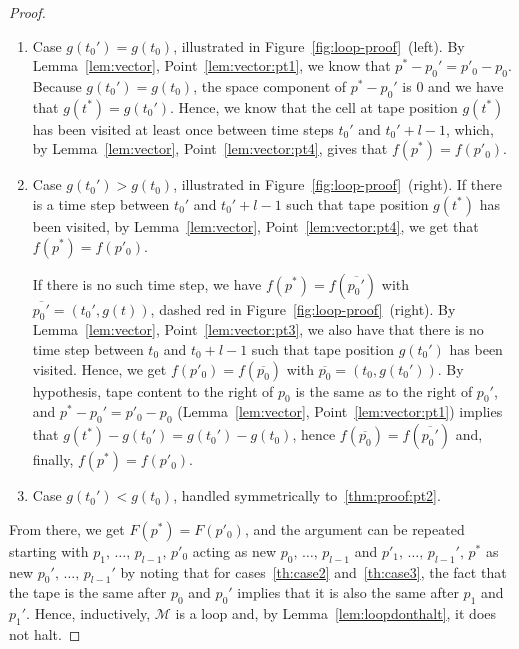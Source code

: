 \begin{proof}
    \begin{enumerate}
        \item Case $g(t_0') = g(t_0)$, illustrated in Figure~\ref{fig:loop-proof}~(left).  By Lemma~\ref{lem:vector}, Point~\ref{lem:vector:pt1}, we know that $p^*-p_0' = p'_0 - p_0$. Because $g(t_0') = g(t_0)$, the space component of $p^*-p_0'$ is 0 and we have that $g(t^*) = g(t_0')$. Hence, we know that the cell at tape position $g(t^*)$ has been visited at least once between time steps $t_0'$ and $t_0'+l-1$, which, by Lemma~\ref{lem:vector}, Point~\ref{lem:vector:pt4}, gives that $f(p^*) = f(p'_0)$.

        \item Case $g(t_0') > g(t_0)$, illustrated in Figure~\ref{fig:loop-proof}~(right). If there is a time step between $t_0'$ and $t_0'+l-1$ such that tape position $g(t^*)$ has been visited, by Lemma~\ref{lem:vector}, Point~\ref{lem:vector:pt4}, we get that $f(p^*) = f(p'_0)$.

              If there is no such time step, we have $f(p^*) = f(\overline{p_0'})$ with $\overline{p_0'} = (t_0',g(t))$, dashed red in Figure~\ref{fig:loop-proof}~(right). By Lemma~\ref{lem:vector}, Point~\ref{lem:vector:pt3}, we also have that there is no time step between $t_0$ and $t_0+l-1$ such that tape position $g(t_0')$ has been visited. Hence, we  get $f(p'_0) = f(\overline{p_0})$ with $\overline{p_0} = (t_0,g(t_0'))$. By hypothesis, tape content to the right of $p_0$ is the same as to the right of $p_0'$, and $p^*-p_0' = p'_0 - p_0$ (Lemma~\ref{lem:vector}, Point~\ref{lem:vector:pt1}) implies that $g(t^*)-g(t_0') = g(t_0') - g(t_0)$, hence $f(\overline{p_0}) = f(\overline{p_0'})$ and, finally, $f(p^*) = f(p'_0)$.\label{thm:proof:pt2}
        \item Case $g(t_0') < g(t_0)$, handled symmetrically to~\ref{thm:proof:pt2}.
    \end{enumerate}
    From there, we get $F(p^*) = F(p'_0)$, and the argument can be repeated starting with $p_1,\, \dots,\, p_{l-1},\, p'_0$ acting as new $p_0,\,\dots,\,p_{l-1}$ and $p'_1,\, \dots,\, p_{l-1}',\, p^*$ as new $p_0',\,\dots,\,p_{l-1}'$ by noting that for cases~\ref{th:case2} and~\ref{th:case3}, the fact that the tape is the same after $p_0$ and $p_0'$ implies that it is also the same after $p_1$ and $p_1'$. Hence, inductively, $\mathcal{M}$ is a loop and, by Lemma~\ref{lem:loopdonthalt}, it does not halt.
\end{proof}

